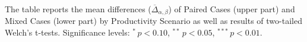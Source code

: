 \documentclass[10pt,letterpaper]{article}
\begin{document}
\begin{table}[ht!]
\begin{adjustwidth}{-1in}{0in}
\begin{tabular}{lcd{3.3}ccd{3.3}cd{3.3}d{1.6}}
                                                                                                                                                                                                                                                                                       \\[-1.5ex]
\end{tabular}
\begin{flushleft}
   The table reports the mean differences ($\overline{\Delta}_{\alpha,\beta}$) of Paired Cases (upper part) and Mixed Cases (lower part) by Productivity Scenario as well as results of two-tailed Welch's t-tests. Significance levels: $^{*}$\,$p<0.10$, $^{**}$\,$p<0.05$, $^{***}$\,$p<0.01$.
\end{flushleft}
\end{adjustwidth}
\end{table}
\end{document}
